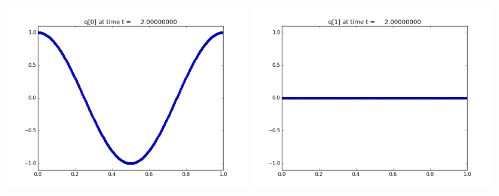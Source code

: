 \documentclass[11pt]{article}
\begin{document}
\vskip 10pt 
\includegraphics[width=0.475\textwidth]{frame0040fig0.png}
\includegraphics[width=0.475\textwidth]{frame0040fig1.png}
\end{document}
